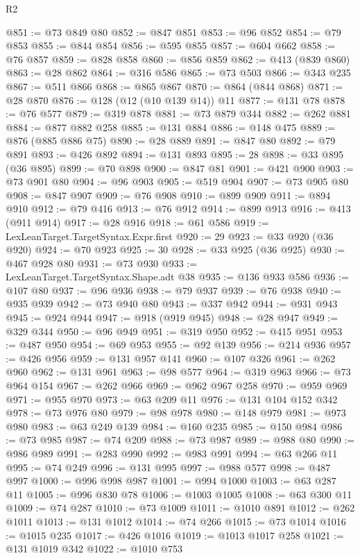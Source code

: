 \begin{lexlean}{R2}
\begin{coremodule}
@851 := @73 @849 @80
@852 := @847 @851
@853 := @96 @852
@854 := @79 @853
@855 := @844 @854
@856 := @595 @855
@857 := @604 @662
@858 := @76 @857
@859 := @828 @858
@860 := @856 @859
@862 := @413 (@839 @860)
@863 := @28 @862
@864 := @316 @586
@865 := @73 @503
@866 := @343 @235
@867 := @511 @866
@868 := @865 @867
@870 := @864 (@844 @868)
@871 := @28 @870
@876 := @128 (@12 (@10 @139 @14)) @11
@877 := @131 @78
@878 := @76 @577
@879 := @319 @878
@881 := @73 @879 @344
@882 := @262 @881
@884 := @877 @882 @258
@885 := @131 @884
@886 := @148 @475
@889 := @876 (@885 @886 @75)
@890 := @28 @889
@891 := @847 @80
@892 := @79 @891
@893 := @426 @892
@894 := @131 @893
@895 := 28
@898 := @33 @895 (@36 @895)
@899 := @70 @898
@900 := @847 @81
@901 := @421 @900
@903 := @73 @901 @80
@904 := @96 @903
@905 := @519 @904
@907 := @73 @905 @80
@908 := @847 @907
@909 := @76 @908
@910 := @899 @909
@911 := @894 @910
@912 := @79 @416
@913 := @76 @912
@914 := @899 @913
@916 := @413 (@911 @914)
@917 := @28 @916
@918 := @61 @586
@919 := LexLeanTarget.TargetSyntax.Expr.first
@920 := 29
@923 := @33 @920 (@36 @920)
@924 := @70 @923
@925 := 30
@928 := @33 @925 (@36 @925)
@930 := @467 @928 @80
@931 := @73 @930
@933 := LexLeanTarget.TargetSyntax.Shape.adt @38
@935 := @136 @933 @586
@936 := @107 @80
@937 := @96 @936
@938 := @79 @937
@939 := @76 @938
@940 := @935 @939
@942 := @73 @940 @80
@943 := @337 @942
@944 := @931 @943
@945 := @924 @944
@947 := @918 (@919 @945)
@948 := @28 @947
@949 := @329 @344
@950 := @96 @949
@951 := @319 @950
@952 := @415 @951
@953 := @487 @950
@954 := @69 @953
@955 := @92 @139
@956 := @214 @936
@957 := @426 @956
@959 := @131 @957 @141
@960 := @107 @326
@961 := @262 @960
@962 := @131 @961
@963 := @98 @577
@964 := @319 @963
@966 := @73 @964 @154
@967 := @262 @966
@969 := @962 @967 @258
@970 := @959 @969
@971 := @955 @970
@973 := @63 @209 @11
@976 := @131 @104 @152 @342
@978 := @73 @976 @80
@979 := @98 @978
@980 := @148 @979
@981 := @973 @980
@983 := @63 @249 @139
@984 := @160 @235
@985 := @150 @984
@986 := @73 @985
@987 := @74 @209
@988 := @73 @987
@989 := @988 @80
@990 := @986 @989
@991 := @283 @990
@992 := @983 @991
@994 := @63 @266 @11
@995 := @74 @249
@996 := @131 @995
@997 := @988 @577
@998 := @487 @997
@1000 := @996 @998 @987
@1001 := @994 @1000
@1003 := @63 @287 @11
@1005 := @996 @830 @78
@1006 := @1003 @1005
@1008 := @63 @300 @11
@1009 := @74 @287
@1010 := @73 @1009
@1011 := @1010 @891
@1012 := @262 @1011
@1013 := @131 @1012
@1014 := @74 @266
@1015 := @73 @1014
@1016 := @1015 @235
@1017 := @426 @1016
@1019 := @1013 @1017 @258
@1021 := @131 @1019 @342
@1022 := @1010 @753

\end{coremodule}
\end{lexlean}
